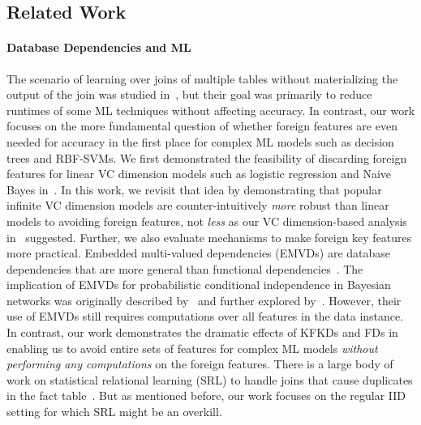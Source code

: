 \documentclass{vldb}
\begin{document}
\subsection*{Related Work}


\paragraph*{\textbf{Database Dependencies and ML}}
The scenario of learning over joins of multiple tables without materializing the output of the join was studied in~\cite{orion,olteanuf,rendle,santoku},
but their goal was primarily to reduce runtimes of some ML techniques without affecting accuracy.
In contrast, our work focuses on the more fundamental question of whether foreign features are even needed for accuracy in the first place for complex ML models
such as decision trees and RBF-SVMs.
We first demonstrated the feasibility of discarding foreign features for linear VC dimension models such as logistic regression and Naive Bayes in~\cite{hamlet}.
In this work, we revisit that idea by demonstrating that popular infinite VC dimension models are counter-intuitively \textit{more} robust than linear models to avoiding 
foreign features, not \textit{less} as our VC dimension-based analysis in~\cite{hamlet} suggested. Further, we also evaluate mechanisms to make foreign key features more practical.
Embedded multi-valued dependencies (EMVDs) are database dependencies that are more general than functional dependencies~\cite{dbtheorybook}. 
The implication of EMVDs for probabilistic conditional independence in Bayesian networks was originally described by~\cite{pearl} and further explored by~\cite{wong}.
However, their use of EMVDs still requires computations over all features in the data instance. In contrast, our work demonstrates the dramatic effects of KFKDs and FDs 
in enabling us to avoid entire sets of features for complex ML models \textit{without performing any computations} on the foreign features.
There is a large body of work on statistical relational learning (SRL) to handle joins that cause duplicates in the fact table~\cite{srlbook}. But as mentioned before, 
our work focuses on the regular IID setting for which SRL might be an overkill.
\end{document}

